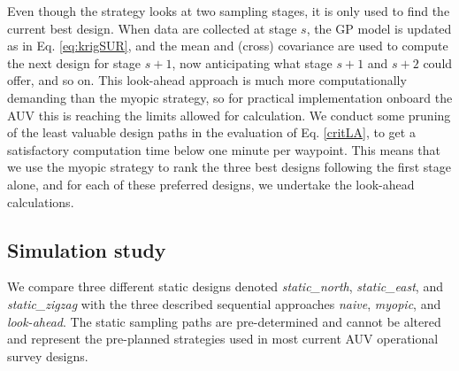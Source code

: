 Even though the strategy looks at two sampling stages, it is only used to find
the current best design. When data are collected at stage $s$, the GP model is
updated as in Eq. \eqref{eq:krigSUR}, and the mean and (cross) covariance are
used to compute the next design for stage $s+1$, now anticipating what
stage $s+1$ and $s+2$ could offer, and so on.
This look-ahead approach is much more computationally demanding than
the myopic strategy, so for practical implementation onboard the AUV this is reaching the limits allowed for calculation. We conduct some pruning of the least valuable design paths in the evaluation of Eq. \eqref{critLA}, to get a satisfactory computation time below one minute per waypoint. This means that we use the myopic
strategy to rank the three best designs following the first stage alone, and
for each of these preferred designs, we undertake the look-ahead calculations.

\subsection{Simulation study}
\label{sec:simulations}

\label{sec:sampling_designs}


We compare three different static designs denoted
\textit{static\_north}, \textit{static\_east}, and
\textit{static\_zigzag} with the three described sequential approaches
\textit{naive}, \textit{myopic}, and \textit{look-ahead}. The static
sampling paths are pre-determined and cannot be altered and represent
the pre-planned strategies used in most current AUV operational survey
designs.

